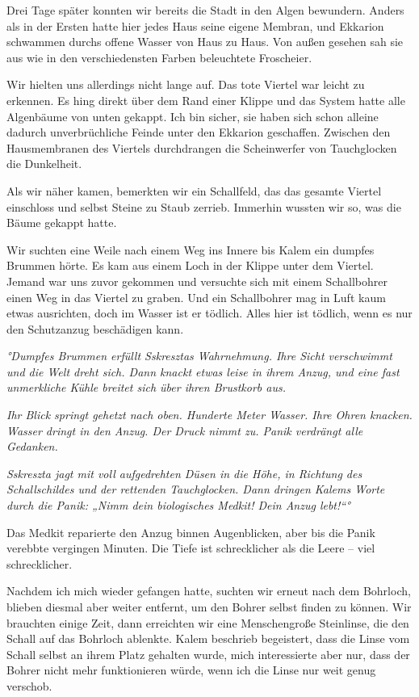 \documentclass[11pt]{scrartcl}
\begin{document}
Drei Tage später konnten wir bereits die Stadt in den Algen bewundern.
Anders als in der Ersten hatte hier jedes Haus seine eigene Membran, und
Ekkarion schwammen durchs offene Wasser von Haus zu Haus. Von außen
gesehen sah sie aus wie in den verschiedensten Farben beleuchtete
Froscheier.

Wir hielten uns allerdings nicht lange auf. Das tote Viertel war leicht
zu erkennen. Es hing direkt über dem Rand einer Klippe und das System
hatte alle Algenbäume von unten gekappt. Ich bin sicher, sie haben sich
schon alleine dadurch unverbrüchliche Feinde unter den Ekkarion
geschaffen. Zwischen den Hausmembranen des Viertels durchdrangen die
Scheinwerfer von Tauchglocken die Dunkelheit.

Als wir näher kamen, bemerkten wir ein Schallfeld, das das gesamte
Viertel einschloss und selbst Steine zu Staub zerrieb. Immerhin wussten
wir so, was die Bäume gekappt hatte.

Wir suchten eine Weile nach einem Weg ins Innere bis Kalem ein dumpfes
Brummen hörte. Es kam aus einem Loch in der Klippe unter dem Viertel.
Jemand war uns zuvor gekommen und versuchte sich mit einem Schallbohrer
einen Weg in das Viertel zu graben. Und ein Schallbohrer mag in Luft
kaum etwas ausrichten, doch im Wasser ist er tödlich. Alles hier ist
tödlich, wenn es nur den Schutzanzug beschädigen kann.

\emph{°Dumpfes Brummen erfüllt Sskresztas Wahrnehmung. Ihre Sicht
verschwimmt und die Welt dreht sich. Dann knackt etwas leise in ihrem
Anzug, und eine fast unmerkliche Kühle breitet sich über ihren Brustkorb
aus.}

\emph{Ihr Blick springt gehetzt nach oben. Hunderte Meter Wasser. Ihre
Ohren knacken. Wasser dringt in den Anzug. Der Druck nimmt zu. Panik
verdrängt alle Gedanken.}

\emph{Sskreszta jagt mit voll aufgedrehten Düsen in die Höhe, in
Richtung des Schallschildes und der rettenden Tauchglocken. Dann dringen
Kalems Worte durch die Panik: „Nimm dein biologisches Medkit! Dein Anzug
lebt!``°}

Das Medkit reparierte den Anzug binnen Augenblicken, aber bis die Panik
verebbte vergingen Minuten. Die Tiefe ist schrecklicher als die Leere --
viel schrecklicher.

Nachdem ich mich wieder gefangen hatte, suchten wir erneut nach dem
Bohrloch, blieben diesmal aber weiter entfernt, um den Bohrer selbst
finden zu können. Wir brauchten einige Zeit, dann erreichten wir eine
Menschengroße Steinlinse, die den Schall auf das Bohrloch ablenkte.
Kalem beschrieb begeistert, dass die Linse vom Schall selbst an ihrem
Platz gehalten wurde, mich interessierte aber nur, dass der Bohrer nicht
mehr funktionieren würde, wenn ich die Linse nur weit genug verschob.
\end{document}
